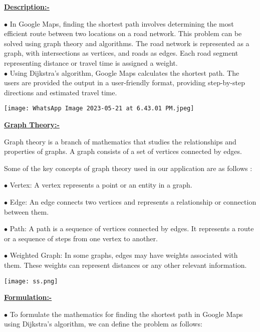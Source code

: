 \documentclass[23pt]{article}
\begin{document}
\hypertarget{target:Description}{}

\begin{center}
\centering  \item \textbf{\huge\underline{Description:-}}
\end{center}
\Large
$\bullet$ In Google Maps, finding the shortest path involves determining the most efficient route between two locations on a road network. This problem can be solved using graph theory and algorithms. The road network is represented as a graph, with intersections as vertices, and roads as edges. Each road segment representing distance or travel time is assigned a weight.
\\
$\bullet$ Using Dijkstra's algorithm, Google Maps calculates the shortest path. The users are provided the output in a user-friendly format, providing step-by-step directions and estimated travel time.
\begin{center}
\cite{lanning2014dijkstra}
    \texttt{[image: WhatsApp Image 2023-05-21 at 6.43.01 PM.jpeg]}
\end{center}
\hypertarget{target:Graph Theory}{}
\begin{center}
\centering  \item \textbf{\huge\underline{Graph Theory:-}}
\end{center}
Graph theory is a branch of mathematics that studies the relationships and properties of graphs. A graph consists of a set of vertices connected by edges. 

Some of the key concepts of graph theory used in our application are as follows :

$\bullet$ Vertex: A vertex represents a point or an entity in a graph.

$\bullet$ Edge: An edge connects two vertices and represents a relationship or connection between them.

$\bullet$ Path: A path is a sequence of vertices connected by edges. It represents a route or a sequence of steps from one vertex to another.

$\bullet$ Weighted Graph: In some graphs, edges may have weights associated with them. These weights can represent distances or any other relevant information. 
\cite{graphtheoryimage}
\begin{center}
\texttt{[image: ss.png]}
\end{center}
\hypertarget{target:Formulation}{}
\begin{center}
\centering  \item \textbf{\huge\underline{Formulation:-}} 
\end{center}
\Large 
$\bullet$ To formulate the mathematics for finding the shortest path in Google Maps using Dijkstra's algorithm, we can define the problem as follows: \cite{michaels1991applications}
\end{document}
